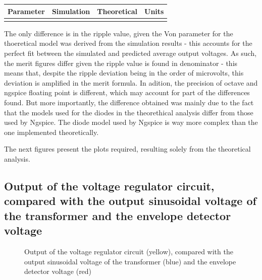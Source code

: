 \hfill
 \parbox{1\linewidth}{
  \centering
  \begin{tabular}{|l|l|l|r|}
    \hline    
    {\bf Parameter} & {\bf Simulation} & {\bf Theoretical } & {\bf Units }\\ \hline
    
  \label{tab:results}
  \end{tabular}
  }
  
 
  
\vspace{2cm}
    The only difference is in the ripple value, given the Von parameter for the thoeretical model was derived from the simulation results - this accounts for the perfect fit between the simulated and predicted average output voltages. As such, the merit figures differ given the ripple value is found in denominator - this means that, despite the ripple deviation being in the order of microvolts, this deviation is amplified in the merit formula. In adition, the precision of octave and ngspice floating point is different, which may account for part of the differences found. But more importantly, the difference obtained was mainly due to the fact that the models
used for the diodes in the theorethical analysis differ from those used by Ngspice. The diode
model used by Ngspice is way more complex than the one implemented theoretically.
  
  The next figures present the plots required, resulting solely from the theoretical analysis.




\subsection{Output of the voltage regulator circuit, compared with the output sinusoidal voltage of the transformer and the envelope detector voltage}

\par
\begin{figure}[H] \centering
\caption{Output of the voltage regulator circuit (yellow), compared with the output sinusoidal voltage of the transformer (blue) and the envelope detector voltage (red)}
\label{fig:all_vout}
\end{figure}


